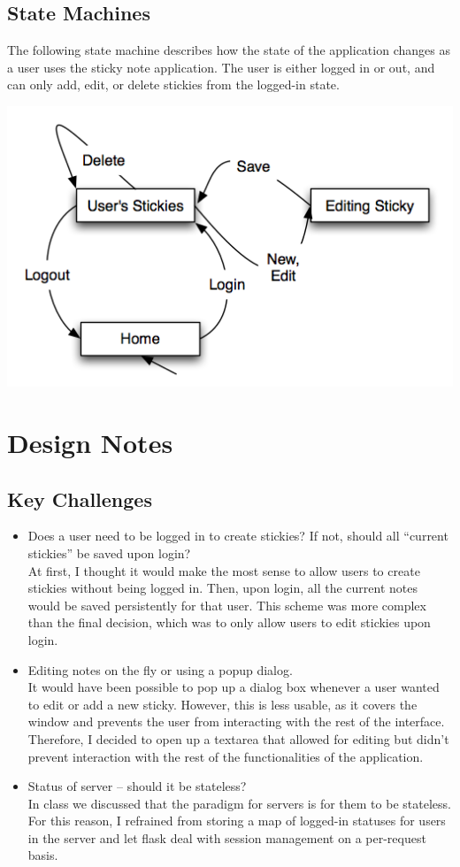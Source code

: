 \documentclass[11pt,letterpaper]{article}
\begin{document}
\subsection{State Machines}
The following state machine describes how the state of the application changes as a user uses the sticky note application. The user is either logged in or out, and can only add, edit, or delete stickies from the logged-in state.
\begin{center}
\includegraphics[width=7in]{dot/statediagram.png}
\label{fig:sm1} 
\end{center}

\section{Design Notes}
\subsection{Key Challenges}
\begin{itemize}
\item Does a user need to be logged in to create stickies? If not, should all ``current stickies'' be saved upon login?\\
At first, I thought it would make the most sense to allow users to create stickies without being logged in. Then, upon login, all the current notes would be saved persistently for that user. This scheme was more complex than the final decision, which was to only allow users to edit stickies upon login.
\item Editing notes on the fly or using a popup dialog.\\
It would have been possible to pop up a dialog box whenever a user wanted to edit or add a new sticky. However, this is less usable, as it covers the window and prevents the user from interacting with the rest of the interface. Therefore, I decided to open up a textarea that allowed for editing but didn't prevent interaction with the rest of the functionalities of the application.
\item Status of server -- should it be stateless?\\
In class we discussed that the paradigm for servers is for them to be stateless. For this reason, I refrained from storing a map of logged-in statuses for users in the server and let flask deal with session management on a per-request basis.
\end{itemize}
\end{document}
